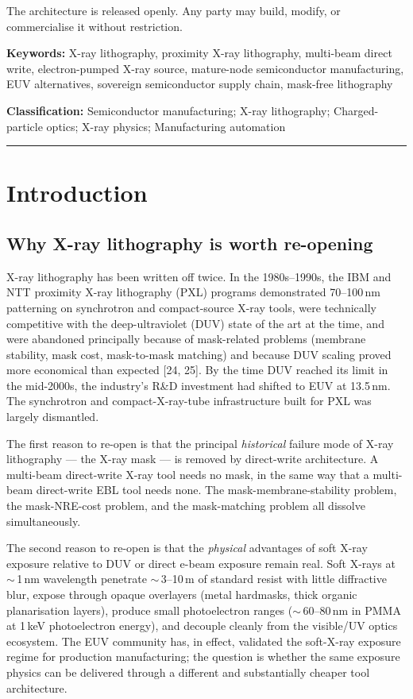 \documentclass[11pt,letterpaper]{article}
\begin{document}
The architecture is released openly. Any party may build, modify, or commercialise it without restriction.

\medskip
\noindent\textbf{Keywords:} X-ray lithography, proximity X-ray lithography, multi-beam direct write, electron-pumped X-ray source, mature-node semiconductor manufacturing, EUV alternatives, sovereign semiconductor supply chain, mask-free lithography

\medskip
\noindent\textbf{Classification:} Semiconductor manufacturing; X-ray lithography; Charged-particle optics; X-ray physics; Manufacturing automation

\bigskip\hrule\bigskip

\section{Introduction}

\subsection{Why X-ray lithography is worth re-opening}

X-ray lithography has been written off twice. In the 1980s--1990s, the IBM and NTT proximity X-ray lithography (PXL) programs demonstrated 70--100\,nm patterning on synchrotron and compact-source X-ray tools, were technically competitive with the deep-ultraviolet (DUV) state of the art at the time, and were abandoned principally because of mask-related problems (membrane stability, mask cost, mask-to-mask matching) and because DUV scaling proved more economical than expected [24, 25]. By the time DUV reached its limit in the mid-2000s, the industry's R\&D investment had shifted to EUV at 13.5\,nm. The synchrotron and compact-X-ray-tube infrastructure built for PXL was largely dismantled.

The first reason to re-open is that the principal \textit{historical} failure mode of X-ray lithography --- the X-ray mask --- is removed by direct-write architecture. A multi-beam direct-write X-ray tool needs no mask, in the same way that a multi-beam direct-write EBL tool needs none. The mask-membrane-stability problem, the mask-NRE-cost problem, and the mask-matching problem all dissolve simultaneously.

The second reason to re-open is that the \textit{physical} advantages of soft X-ray exposure relative to DUV or direct e-beam exposure remain real. Soft X-rays at $\sim$\,1\,nm wavelength penetrate $\sim$\,3--10\,\textmu m of standard resist with little diffractive blur, expose through opaque overlayers (metal hardmasks, thick organic planarisation layers), produce small photoelectron ranges ($\sim$\,60--80\,nm in PMMA at 1\,keV photoelectron energy), and decouple cleanly from the visible/UV optics ecosystem. The EUV community has, in effect, validated the soft-X-ray exposure regime for production manufacturing; the question is whether the same exposure physics can be delivered through a different and substantially cheaper tool architecture.
\end{document}
